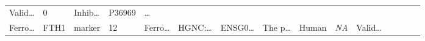 \documentclass[
]{article}
\begin{document}
\begin{longtable}[]{@{}lllllllllllllll@{}}
\begin{minipage}[t]{0.05\columnwidth}
Valid\ldots{}\strut
\end{minipage} & \begin{minipage}[t]{0.05\columnwidth}\raggedright
0\strut
\end{minipage} & \begin{minipage}[t]{0.05\columnwidth}\raggedright
Inhib\ldots{}\strut
\end{minipage} & \begin{minipage}[t]{0.05\columnwidth}\raggedright
P36969\strut
\end{minipage} & \begin{minipage}[t]{0.02\columnwidth}\raggedright
\ldots{}\strut
\end{minipage}\tabularnewline
\begin{minipage}[t]{0.05\columnwidth}\raggedright
Ferro\ldots{}\strut
\end{minipage} & \begin{minipage}[t]{0.04\columnwidth}\raggedright
FTH1\strut
\end{minipage} & \begin{minipage}[t]{0.04\columnwidth}\raggedright
marker\strut
\end{minipage} & \begin{minipage}[t]{0.02\columnwidth}\raggedright
12\strut
\end{minipage} & \begin{minipage}[t]{0.05\columnwidth}\raggedright
Ferro\ldots{}\strut
\end{minipage} & \begin{minipage}[t]{0.05\columnwidth}\raggedright
HGNC:\ldots{}\strut
\end{minipage} & \begin{minipage}[t]{0.05\columnwidth}\raggedright
ENSG0\ldots{}\strut
\end{minipage} & \begin{minipage}[t]{0.05\columnwidth}\raggedright
The p\ldots{}\strut
\end{minipage} & \begin{minipage}[t]{0.04\columnwidth}\raggedright
Human\strut
\end{minipage} & \begin{minipage}[t]{0.05\columnwidth}\raggedright
\emph{NA}\strut
\end{minipage} & \begin{minipage}[t]{0.05\columnwidth}\raggedright
Valid\ldots{}\strut
\end{minipage} & \begin{minipage}[t]{0.05\columnwidth}\raggedright

\end{minipage}
\end{longtable}
\end{document}
